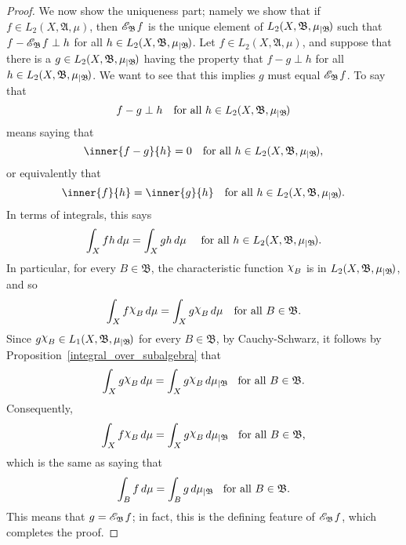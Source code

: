 \documentclass[
twoside=true,
paper=letter,
fontsize=9pt,
pagesize=auto,
leqno,
openany,
headsepline,
overfullrule,
]{scrbook}
\theoremstyle{plain}
\theoremstyle{plain}
\theoremstyle{definition}
\theoremstyle{bfnoteitalic}
\theoremstyle{bfnoteroman}
\newcommand{\sigalg}[1]{\mathfrak{#1}}
\newcommand{\cali}[1]{\mathscr{#1}}
\newcommand{\condexpsub}[2]
{\mathop{\cali{E}\hspace{-1.5pt}}\nolimits_{#2}\hspace{-1pt}#1}
\newcommand{\charfunction}[1]{{\raisebox{2pt}{$\chi$}}_{#1}}
\newcommand{\restrictedto}[1]{_{\lvert#1}\kern-1.5pt}
\newcommand{\sigmaalgebra}{\sigalg{A}}
\newcommand{\sigmaalgebraii}{\sigalg{B}}
\newcommand{\function}{f}
\newcommand{\functionii}{g}
\newcommand{\functioniii}{h}
\newcommand{\measurespace}{X}
\newcommand{\measure}{\mu}
\begin{document}
\begin{proof}
We now show the uniqueness part; namely we show that if
$\function\in L_2(\measurespace, \sigmaalgebra,\measure)$, then 
$\condexpsub{\function}{\sigmaalgebraii}$ is the
unique element of 
$L_2(\measurespace, \sigmaalgebraii,\measure\restrictedto{\sigmaalgebraii})$
such that 
$\function - \condexpsub{\function}{\sigmaalgebraii} \perp \functioniii$ for all $\functioniii\in
L_2(\measurespace, \sigmaalgebraii,\measure\restrictedto{\sigmaalgebraii})$.
Let
$\function\in L_2(\measurespace, \sigmaalgebra,\measure)$,
and suppose that there is a 
$\functionii \in L_2(\measurespace, \sigmaalgebraii,\measure\restrictedto{\sigmaalgebraii})$
having the property that
$\function-\functionii\perp \functioniii$ for all $\functioniii\in
L_2(\measurespace, \sigmaalgebraii,\measure\restrictedto{\sigmaalgebraii})$.
We want to see that this implies $\functionii$ must equal 
$\condexpsub{\function}{\sigmaalgebraii}$.
To say that 
\[
\function-\functionii\perp \functioniii 
\quad\text{for all $\functioniii\in
L_2(\measurespace, \sigmaalgebraii,\measure\restrictedto{\sigmaalgebraii})$}
\]
means saying that 
\[
\inner{\function-\functionii}{\functioniii} = 0 
\quad\text{for all 
$\functioniii\in L_2(\measurespace, \sigmaalgebraii,\measure\restrictedto{\sigmaalgebraii})$},
\]
or equivalently that 
\[
\inner{\function}{\functioniii} = \inner{\functionii}{\functioniii}
\quad\text{for all 
$\functioniii\in L_2(\measurespace, \sigmaalgebraii,\measure\restrictedto{\sigmaalgebraii})$}.
\]
In terms of integrals, this says
\[
\int_\measurespace \function\functioniii \, d\measure
=
\int_\measurespace \functionii\functioniii \, d\measure
\quad\text{ 
for all
$\functioniii\in L_2(\measurespace, \sigmaalgebraii,\measure\restrictedto{\sigmaalgebraii})$}.
\]
In particular, for every $B\in\sigmaalgebraii$, the characteristic function 
$\charfunction{B}$ is in 
$L_2(\measurespace, \sigmaalgebraii,\measure\restrictedto{\sigmaalgebraii})$, and so
\[
\int_\measurespace \function\charfunction{B} \, d\measure
=
\int_\measurespace \functionii\charfunction{B} \, d\measure
\quad\text{for all
$B\in\sigmaalgebraii$}.
\]
Since 
$\functionii\charfunction{B}
\in L_1(\measurespace, \sigmaalgebraii,\measure\restrictedto{\sigmaalgebraii})$ 
for every $B\in\sigmaalgebraii$, by Cauchy-Schwarz,
it follows by Proposition~\ref{integral_over_subalgebra} that
\[
\int_\measurespace \functionii\charfunction{B}\, d\measure
=
\int_\measurespace \functionii\charfunction{B}\, d\measure\restrictedto{\sigmaalgebraii}
\quad\text{for all
$B\in\sigmaalgebraii$}.
\]
Consequently, 
\[
\int_\measurespace \function\charfunction{B} \, d\measure
=
\int_\measurespace \functionii\charfunction{B} \, d\measure\restrictedto{\sigmaalgebraii}
\quad
\text{for all
$B\in\sigmaalgebraii$,}
\]
which is the same as saying that
\[
\int_B \function \, d\measure
=
\int_B \functionii \, d\measure\restrictedto{\sigmaalgebraii}
\quad\text{for all $B\in\sigmaalgebraii$.}
\]
This means that $\functionii = \condexpsub{\function}{\sigmaalgebraii}$;  in fact, this is the defining feature of $\condexpsub{\function}{\sigmaalgebraii}$, which completes the proof.
\end{proof}
\end{document}
